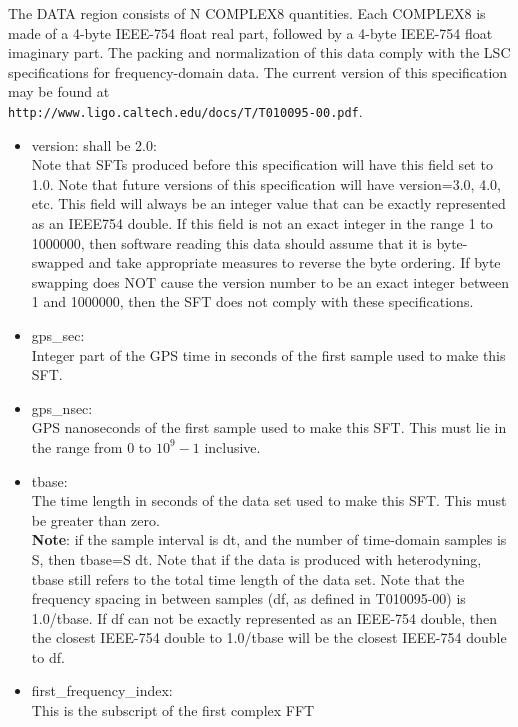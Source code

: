 \documentclass{ligodcc}
\begin{document}
The DATA region consists of N COMPLEX8 quantities.  Each COMPLEX8 is
made of a 4-byte IEEE-754 float real part, followed by a 4-byte
IEEE-754 float imaginary part.  The packing and normalization of this
data comply with the LSC specifications for frequency-domain data.
The current version of this specification may be found at\\
{\tt http://www.ligo.caltech.edu/docs/T/T010095-00.pdf}.

\begin{itemize}
\item version: shall be 2.0:\\
    Note that SFTs produced before this specification will have this
    field set to 1.0.  Note that future versions of this specification
    will have version=3.0, 4.0, etc.  This field will always be an
    integer value that can be exactly represented as an IEEE754
    double.  If this field is not an exact integer in the range 1 to
    1000000, then software reading this data should assume that it is
    byte-swapped and take appropriate measures to reverse the byte
    ordering.  If byte swapping does NOT cause the version number
    to be an exact integer between 1 and 1000000, then the SFT does
    not comply with these specifications.
\item gps\_sec:\\
Integer part of the GPS time in seconds of the first sample used to make
         this SFT.
\item gps\_nsec:\\
GPS nanoseconds of the first sample used to make this SFT.  This
          must lie in the range from 0 to $10^{9}-1$ inclusive.
\item tbase:\\
    The time length in seconds of the data set used to make this SFT.
     This must be greater than zero.\\
    {\bf Note}: if the sample interval is dt, and the number of
    time-domain samples is S, then tbase=S dt.  Note that if the data
    is produced with heterodyning, tbase still refers to the total
    time length of the data set.  Note that the frequency spacing in
    between samples (df, as defined in T010095-00) is 1.0/tbase.  If df
    can not be exactly represented as an IEEE-754 double, then the closest
    IEEE-754 double to 1.0/tbase will be the closest IEEE-754 double to df.
\item first\_frequency\_index:\\
This is the subscript of the first complex FFT

\end{itemize}
\end{document}
